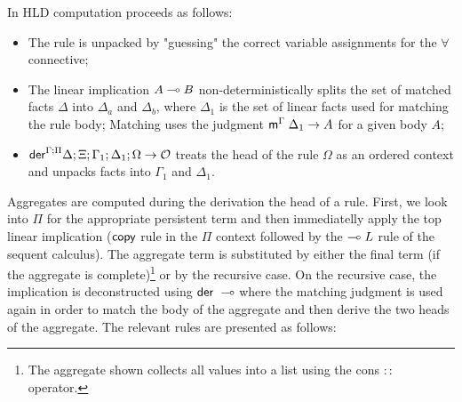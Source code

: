 In HLD computation proceeds as follows:
\begin{itemize}[leftmargin=*]

   \item The rule is unpacked by "guessing" the correct variable assignments for
   the $\forall$ connective;

   \item The linear implication $A \multimap B$ non-deterministically splits the
   set of matched facts $\Delta$ into $\Delta_a$ and $\Delta_b$, where
   $\Delta_1$ is the set of linear facts used for matching the rule body;
   Matching uses the judgment $\mathsf{m}^{\Gamma} \; \Delta_1 \rightarrow A$ for a given
   body $A$;

   \item $\mathsf{der}^{\Gamma ; \Pi} \Delta ; \Xi; \Gamma_1; \Delta_1; \Omega \rightarrow \mathcal{O}$
   treats the head of the rule $\Omega$ as an ordered context and unpacks facts
   into $\Gamma_1$ and $\Delta_1$.

\end{itemize}

Aggregates are computed during the derivation the head of a rule.  First, we
look into $\Pi$ for the appropriate persistent term and then immediatelly apply
the top linear implication ($\mathsf{copy}$ rule in the $\Pi$ context followed by the
$\multimap L$ rule of the sequent calculus). The aggregate term is substituted by
either the final term (if the aggregate is complete)\footnote{The aggregate
shown collects all values into a list using the cons $::$ operator.} or by the
recursive case. On the recursive case, the implication is deconstructed using
$\mathsf{der} \; \multimap$ where the matching judgment is used again in order to match the
body of the aggregate and then derive the two heads of the aggregate. The
relevant rules are presented as follows:

